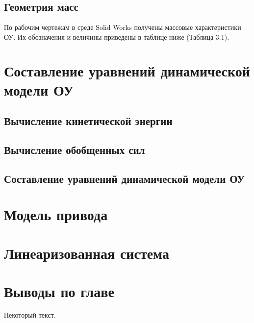 \subsection{Геометрия масс} \label{sec:ch3/sec4}

По рабочим чертежам в среде Solid Works получены массовые характеристики ОУ. Их обозначения и величины приведены в таблице ниже (Таблица 3.1).


\section{Составление уравнений динамической модели ОУ} \label{ch:ch3/sect5}


\subsection{Вычисление кинетической энергии} \label{sec:ch3/sec6}

\subsection{Вычисление обобщенных сил} \label{sec:ch3/sec7}

\subsection{Составление уравнений динамической модели ОУ} \label{sec:ch3/sec8}


\section{Модель привода} \label{ch:ch3/sect9}

\section{Линеаризованная система} \label{ch:ch3/sect10}

\section{Выводы по главе} \label{ch:ch3/sect11}


Некоторый текст.

\clearpage